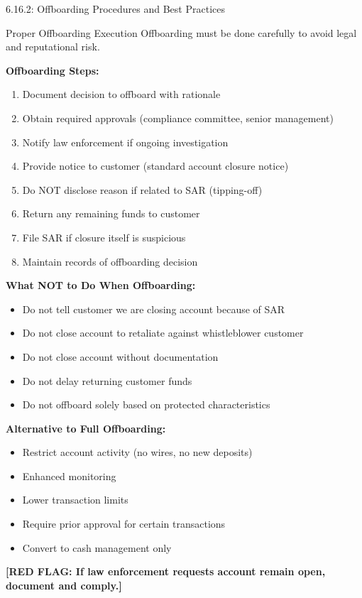 \documentclass[11pt,a4paper]{beamer}
\newcommand{\redflag}[1]{\textcolor{red!80!black}{\textbf{[RED FLAG: #1]}}}
\begin{document}
\begin{frame}{6.16.2: Offboarding Procedures and Best Practices}
	\begin{block}{Proper Offboarding Execution}
		Offboarding must be done carefully to avoid legal and reputational risk.
	\end{block}
	\textbf{Offboarding Steps:}
	\begin{enumerate}
		\item Document decision to offboard with rationale
		\item Obtain required approvals (compliance committee, senior management)
		\item Notify law enforcement if ongoing investigation
		\item Provide notice to customer (standard account closure notice)
		\item Do NOT disclose reason if related to SAR (tipping-off)
		\item Return any remaining funds to customer
		\item File SAR if closure itself is suspicious
		\item Maintain records of offboarding decision
	\end{enumerate}
	\textbf{What NOT to Do When Offboarding:}
	\begin{itemize}
		\item Do not tell customer we are closing account because of SAR
		\item Do not close account to retaliate against whistleblower customer
		\item Do not close account without documentation
		\item Do not delay returning customer funds
		\item Do not offboard solely based on protected characteristics
	\end{itemize}
	\textbf{Alternative to Full Offboarding:}
	\begin{itemize}
		\item Restrict account activity (no wires, no new deposits)
		\item Enhanced monitoring
		\item Lower transaction limits
		\item Require prior approval for certain transactions
		\item Convert to cash management only
	\end{itemize}
	\redflag{If law enforcement requests account remain open, document and comply.}
\end{frame}
\end{document}
